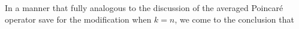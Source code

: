 \documentclass[10pt,a4paper]{article}
\begin{document}
In a manner that fully analogous to the discussion of the averaged Poincar\'e operator save for the modification when $k=n$, 
we come to the conclusion that 
\end{document}
